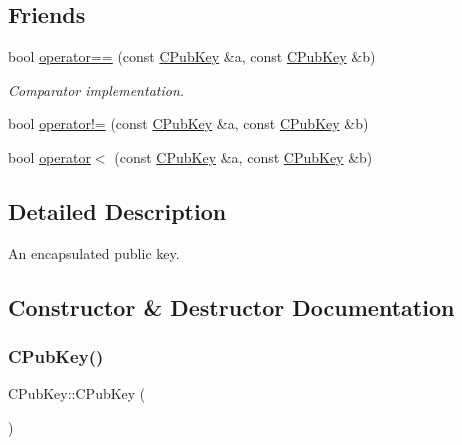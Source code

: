 \subsection*{Friends}
\begin{DoxyCompactItemize}
\item 
bool \mbox{\hyperlink{class_c_pub_key_a864b3cdcb46fb85c1fc07e0686cc3a31}{operator==}} (const \mbox{\hyperlink{class_c_pub_key}{C\+Pub\+Key}} \&a, const \mbox{\hyperlink{class_c_pub_key}{C\+Pub\+Key}} \&b)
\begin{DoxyCompactList}\small\item\em Comparator implementation. \end{DoxyCompactList}\item 
bool \mbox{\hyperlink{class_c_pub_key_af660fd5a8d213211dfff37a2296d09e1}{operator!=}} (const \mbox{\hyperlink{class_c_pub_key}{C\+Pub\+Key}} \&a, const \mbox{\hyperlink{class_c_pub_key}{C\+Pub\+Key}} \&b)
\item 
bool \mbox{\hyperlink{class_c_pub_key_af814095b2c92bedd96a83a0811d52da9}{operator$<$}} (const \mbox{\hyperlink{class_c_pub_key}{C\+Pub\+Key}} \&a, const \mbox{\hyperlink{class_c_pub_key}{C\+Pub\+Key}} \&b)
\end{DoxyCompactItemize}


\subsection{Detailed Description}
An encapsulated public key. 

\subsection{Constructor \& Destructor Documentation}
\mbox{\label{class_c_pub_key_a468f3aef3555d12ede19c0d8dc88c13a}} 
\subsubsection{\texorpdfstring{C\+Pub\+Key()}{CPubKey()}\hspace{0.1cm}{\footnotesize\ttfamily [1/3]}}
{\footnotesize\ttfamily C\+Pub\+Key\+::\+C\+Pub\+Key (\begin{DoxyParamCaption}{ }\end{DoxyParamCaption})\hspace{0.3cm}{\ttfamily [inline]}}



